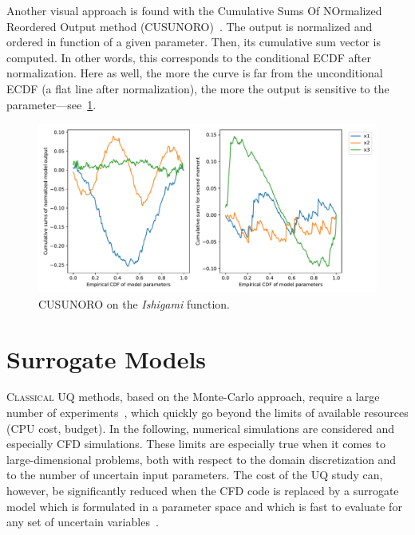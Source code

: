Another visual approach is found with the Cumulative Sums Of NOrmalized Reordered Output method (CUSUNORO)~\cite{Plischke2012}. The output is normalized and ordered in function of a given parameter. Then, its cumulative sum vector is computed. In other words, this corresponds to the conditional ECDF after normalization. Here as well, the more the curve is far from the unconditional ECDF (a flat line after normalization), the more the output is sensitive to the parameter---see~\cref{fig:cusunoro}.

\begin{figure}[!ht]
\centering
\includegraphics[width=\linewidth,keepaspectratio]{fig/literature/cusunoro-ishigami.pdf}
\caption{CUSUNORO on the \emph{Ishigami} function.}
\label{fig:cusunoro}
\end{figure}

\newpage

\section{Surrogate Models}\label{sec:surrogate}

\lettrine{C}{lassical} UQ methods, based on the Monte-Carlo approach, require a large number of experiments~\citep{iooss2010,iooss2016,lamboni2011,lemaitreknio2010,Saltelli2007,storlie2009}, which quickly go beyond the limits of available resources (CPU cost, budget). In the following, numerical simulations are considered and especially CFD simulations. These limits are especially true when it comes to large-dimensional problems, both with respect to the domain discretization and to the number of uncertain input parameters. The cost of the UQ study can, however, be significantly reduced when the CFD code is replaced by a surrogate model which is formulated in a parameter space and which is fast to evaluate for any set of uncertain variables~\cite{martin2005}.


